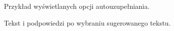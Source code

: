 \documentclass[twoside,a4paper]{book}
\begin{document}
\begin{figure}
		\centering
		\caption{Przykład wyświetlanych opcji autouzupełniania. }
		\label{fig:auto}
\end{figure}
\begin{figure}
		\centering
		\caption{Tekst i podpowiedzi po wybraniu sugerowanego tekstu. }
		\label{fig:textAuto}
\end{figure}
\end{document}
